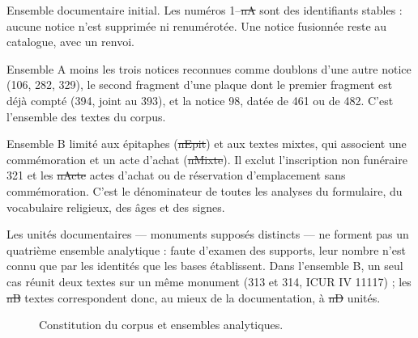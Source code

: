 \begin{description}[style=nextline,leftmargin=1.5em,font=\normalfont\scshape]
\item[Ensemble A — notices (\st{nA})] Ensemble documentaire initial. Les numéros 1–\st{nA} sont des identifiants stables : aucune notice n’est supprimée ni renumérotée. Une notice fusionnée reste au catalogue, avec un renvoi.
\item[Ensemble B — textes distincts datés de 340 à 403 (\st{nB})] Ensemble A moins les trois notices reconnues comme doublons d’une autre notice (106, 282, 329), le second fragment d’une plaque dont le premier fragment est déjà compté (394, joint au 393), et la notice 98, datée de 461 ou de 482. C’est l’ensemble des textes du corpus.
\item[Ensemble C — textes funéraires (\st{nC})] Ensemble B limité aux épitaphes (\st{nEpit}) et aux textes mixtes, qui associent une commémoration et un acte d’achat (\st{nMixte}). Il exclut l’inscription non funéraire 321 et les \st{nActe} actes d’achat ou de réservation d’emplacement sans commémoration. C’est le dénominateur de toutes les analyses du formulaire, du vocabulaire religieux, des âges et des signes.
\end{description}

Les unités documentaires — monuments supposés distincts — ne forment pas un quatrième ensemble analytique : faute d’examen des supports, leur nombre n’est connu que par les identités que les bases établissent. Dans l’ensemble B, un seul cas réunit deux textes sur un même monument (313 et 314, ICUR IV 11117) ; les \st{nB} textes correspondent donc, au mieux de la documentation, à \st{nD} unités.

\begin{figure}[tbp]\centering\small
\setlength{\fboxsep}{5pt}
\caption{Constitution du corpus et ensembles analytiques.}\label{fig:corpus}
\end{figure}

